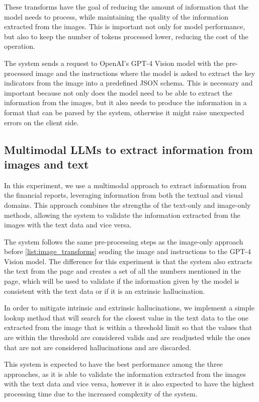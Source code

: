 \documentclass[english, 12pt, a4paper, elec, utf8, a-2b, online]{aaltothesis}
\begin{document}
These transforms have the goal of reducing the amount of information that the model needs to process, while maintaining the quality of the information extracted from the images.
This is important not only for model performance, but also to keep the number of tokens processed lower, reducing the cost of the operation.

The system sends a request to OpenAI's \ac{GPT}-4 Vision model with the pre-processed image and the instructions where the model is asked to extract the key indicators from the image into a predefined JSON schema.
This is necessary and important because not only does the model need to be able to extract the information from the images, but it also needs to produce the information in a format that can be parsed by the system, otherwise it might raise unexpected errors on the client side.

\subsection{Multimodal \ac{LLM}s to extract information from images and text}

In this experiment, we use a multimodal approach to extract information from the financial reports, leveraging information from both the textual and visual domains.
This approach combines the strengths of the text-only and image-only methods, allowing the system to validate the information extracted from the images with the text data and vice versa.

The system follows the same pre-processing steps as the image-only approach before \ref{list:image_transforms} sending the image and instructions to the \ac{GPT}-4 Vision model.
The difference for this experiment is that the system also extracts the text from the page and creates a set of all the numbers mentioned in the page, which will be used to validate if the information given by the model is consistent with the text data or if it is an extrinsic hallucination.

In order to mitigate intrinsic and extrinsic hallucinations, we implement a simple lookup method that will search for the closest value in the text data to the one extracted from the image that is within a threshold limit so that the values that are within the threshold are considered valids and are readjusted while the ones that are not are considered hallucinations and are discarded.

This system is expected to have the best performance among the three approaches, as it is able to validate the information extracted from the images with the text data and vice versa, however it is also expected to have the highest processing time due to the increased complexity of the system.
\end{document}
